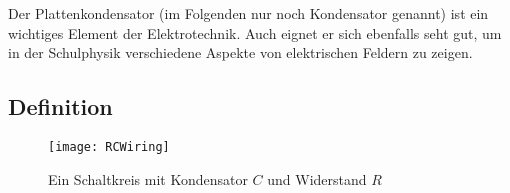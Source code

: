 




%
%	





Der Plattenkondensator (im Folgenden nur noch Kondensator genannt) ist ein wichtiges Element der Elektrotechnik. Auch eignet er sich ebenfalls seht gut, um in der Schulphysik verschiedene Aspekte von elektrischen Feldern zu zeigen.


\subsection{Definition} \label{subsec:kon_def}

\begin{figure}[h!]
	\centering
	\texttt{[image: RCWiring]}
	\caption{Ein Schaltkreis mit Kondensator $C$ und Widerstand $R$}
	\label{fig:CapWirering}
\end{figure}


